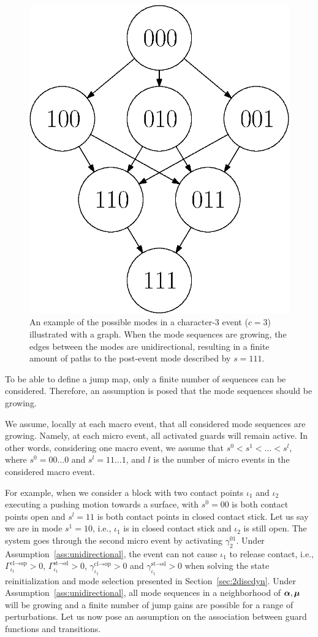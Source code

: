 \documentclass[../DC2017114Bouma.tex]{subfiles}
\begin{document}
\begin{figure}[h]
\centering
\includegraphics[width=.35\textwidth]{4growingseq.eps}\caption{An example of the possible modes in a character-3 event ($c=3$)  illustrated with a graph. When the mode sequences are growing, the edges between the modes are unidirectional, resulting in a finite amount of paths to the post-event mode described by $s = 111$.}\label{fig:4growingseq}
\end{figure}

To be able to define a jump map, only a finite number of sequences can be considered. Therefore, an assumption is posed that the mode sequences should be growing.

\begin{sloppypar}
\begin{myass}\label{ass:unidirectional}
We assume, locally at each macro event, that all considered mode sequences are growing. Namely, at each micro event, all activated guards will remain active. In other words, considering one macro event, we assume that $s^0<s^1<\dots<s^l$, where $s^0= 00\dots0$ and $s^l = 11\dots1$, and $l$ is the number of micro events in the considered macro event.
\end{myass}
\end{sloppypar}

For example, when we consider a block with two contact points $\iota_1$ and $\iota_2$ executing a pushing motion towards a surface, with $s^0 = 00$ is both contact points open and $s^l = 11$ is both contact points in closed contact stick. Let us say we are in mode $s^1 = 10$, i.e., $\iota_1$ is in closed contact stick and $\iota_2$ is still open. The system goes through the second micro event by activating $\gamma^{01}_2$. Under Assumption~\ref{ass:unidirectional}, the event can not cause $\iota_1$ to release contact, i.e., $\Gamma_{\iota_1}^{\text{cl}\rightarrow\text{op}}>0$, $\Gamma_{\iota_1}^{\text{st}\rightarrow\text{sl}}>0$, $\gamma_{\iota_1}^{\text{cl}\rightarrow\text{op}}>0$ and $\gamma_{\iota_1}^{\text{st}\rightarrow\text{sl}}>0$ when solving the state reinitialization and mode selection presented in Section~\ref{sec:2discdyn}. Under Assumption~\ref{ass:unidirectional}, all mode sequences in a neighborhood of $\boldsymbol{\alpha},\boldsymbol{\mu}$ will be growing and a finite number of jump gains are possible for a range of perturbations. Let us now pose an assumption on the association between guard functions and transitions.
\end{document}
